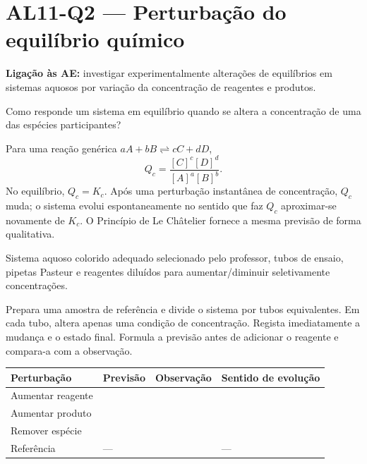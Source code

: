 \documentclass[11pt,a4paper,openany]{book}
\newcommand{\LigAE}[1]{\textbf{Ligação às AE:} #1}
\begin{document}
\section{AL11-Q2 — Perturbação do equilíbrio químico}
\LigAE{investigar experimentalmente alterações de equilíbrios em sistemas aquosos por variação da concentração de reagentes e produtos.}

\begin{questao}
Como responde um sistema em equilíbrio quando se altera a concentração de uma das espécies participantes?
\end{questao}

\begin{fundamento}
Para uma reação genérica $aA+bB\rightleftharpoons cC+dD$,
\[
Q_c=\frac{[C]^c[D]^d}{[A]^a[B]^b}.
\]
No equilíbrio, $Q_c=K_c$. Após uma perturbação instantânea de concentração, $Q_c$ muda; o sistema evolui espontaneamente no sentido que faz $Q_c$ aproximar-se novamente de $K_c$. O Princípio de Le Châtelier fornece a mesma previsão de forma qualitativa.
\end{fundamento}

\begin{material}
Sistema aquoso colorido adequado selecionado pelo professor, tubos de ensaio, pipetas Pasteur e reagentes diluídos para aumentar/diminuir seletivamente concentrações.
\end{material}

\begin{metodo}
Prepara uma amostra de referência e divide o sistema por tubos equivalentes. Em cada tubo, altera apenas uma condição de concentração. Regista imediatamente a mudança e o estado final. Formula a previsão antes de adicionar o reagente e compara-a com a observação.
\end{metodo}

\begin{registo}
\begin{center}
\begin{tabular}{@{}llll@{}}
\toprule
Perturbação & Previsão & Observação & Sentido de evolução\\
\midrule
Aumentar reagente & & &\\
Aumentar produto & & &\\
Remover espécie & & &\\
Referência & --- & & ---\\
\bottomrule
\end{tabular}
\end{center}
\end{registo}
\end{document}
